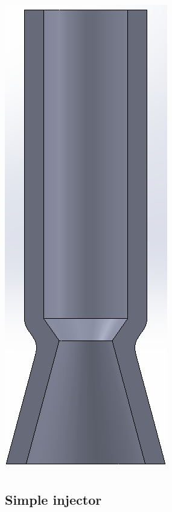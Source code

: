 \documentclass{beamer}
\begin{document}
\begin{frame}
    \centering \includegraphics[height=0.9\textheight]{images/chamber_nozzle.png}
\end{frame}


\subsection{Simple injector}
\end{document}
